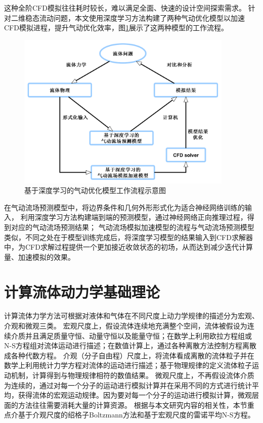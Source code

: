 这种全阶CFD模拟往往耗时较长，难以满足全面、快速的设计空间探索需求。
针对二维稳态流动问题，本文使用深度学习方法构建了两种气动优化模型以加速CFD模拟进程，提升气动优化效率，图\ref{fig:cfd_dnnflow}展示了这两种模型的工作流程。

\begin{figure}[htp]
	\centering
	\includegraphics[width=0.92\textwidth]{figures/cfd_dnnflow.pdf}
	\caption{基于深度学习的气动优化模型工作流程示意图}
	\label{fig:cfd_dnnflow}
\end{figure}

在气动流场预测模型中，将边界条件和几何外形形式化为适合神经网络训练的输入，
利用深度学习方法构建端到端的预测模型，通过神经网络正向推理过程，得到对应的气动流场预测结果；
气动流场模拟加速模型的流程与气动流场预测模型类似，不同之处在于模型训练完成后，将深度学习模型的结果输入到CFD求解器中，为CFD求解过程提供一个更加接近收敛状态的初场，从而达到减少迭代计算量、加速模拟的效果。



\section{计算流体动力学基础理论}
计算流体力学方法可根据对液体和气体在不同尺度上动力学规律的描述分为宏观、介观和微观三类。
宏观尺度上，假设流体连续地充满整个空间，流体被假设为连续介质并且满足质量守恒、动量守恒以及能量守恒；在数学上利用欧拉方程组或N-S方程组对流体运动进行描述；在数值计算上，通过各种离散方法控制方程离散成各种代数方程。
介观（分子自由程）尺度上，将流体看成离散的流体粒子并在数学上利用统计力学方程对流体的运动进行描述；基于物理规律的定义流体粒子运动机制，计算得到与物理规律相符的数值结果。
微观尺度上，不再假设流体介质为连续的，通过对每一个分子的运动进行模拟计算并在采用不同的方式进行统计平均，获得流体的宏观运动规律。因为要对每一个分子的运动进行模拟计算，微观层面的方法往往需要消耗大量的计算资源。
根据与本文研究内容的相关性，本节重点介基于介观尺度的绍格子Boltzmann方法和基于宏观尺度的雷诺平均N-S方程。




